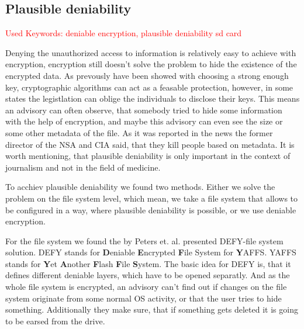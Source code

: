 \documentclass[12pt,a4paper,titlepage,oneside]{scrartcl}
\newcommand\todo[1]{\textcolor{red}{#1}}
\begin{document}
\subsection{Plausible deniability}
\todo{Used Keywords: deniable encryption, plausible deniability sd card}

Denying the unauthorized access to information is relatively easy to achieve with encryption, encryption still doesn't solve the problem to hide the existence of the encrypted data.
As prevously have been showed with choosing a strong enough key, cryptographic algorithms can act as a feasable protection, however, in some states the legistlation can oblige the individuals to disclose their keys.
This means an advisory can often observe, that somebody tried to hide some information with the help of encryption, and maybe this advisory can even see the size or some other metadata of the file.
As it was reported in the news the former director of the NSA and CIA said, that they kill people based on metadata. \cite{coleMetadata}
It is worth mentioning, that plausible deniability is only important in the context of journalism and not in the field of medicine.

To acchiev plausible deniability we found two methods.
Either we solve the problem on the file system level, which mean, we take a file system that allows to be configured in a way, where plausible deniability is possible, or we use deniable encryption.

For the file system we found the by Peters et. al. presented DEFY-file system solution.
DEFY stands for \textbf{D}eniable \textbf{E}ncrypted \textbf{F}ile System for \textbf{Y}AFFS.
YAFFS stands for \textbf{Y}et \textbf{A}nother \textbf{F}lash \textbf{F}ile \textbf{S}ystem.
The basic idea for DEFY is, that it defines different deniable layers, which have to be opened separatly.
And as the whole file system is encrypted, an advisory can't find out if changes on the file system originate from some normal OS activity, or that the user tries to hide something.
Additionally they make sure, that if something gets deleted it is going to be earsed from the drive. \cite{peters2015defy}
\end{document}
